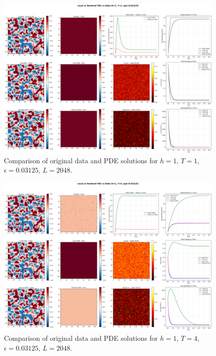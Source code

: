 \documentclass[11pt,a4paper]{article}
\begin{document}
\begin{figure}[!h]
    \centering
    \includegraphics[width=1.0\textwidth]{fig/compare_local_nonlocal_L2048_h1_T1_eps0.03125.png}
    \caption{Comparison of original data and PDE solutions for $h=1$, $T=1$, $\epsilon=0.03125$, $L=2048$.}
    \label{fig:pde_comparison_h1_T1_eps0.03125_L2048}
\end{figure}


\begin{figure}[h]
    \centering
    \includegraphics[width=1.0\textwidth]{fig/compare_local_nonlocal_L2048_h1_T4_eps0.03125.png}
    \caption{Comparison of original data and PDE solutions for $h=1$, $T=4$, $\epsilon=0.03125$, $L=2048$.}
    \label{fig:pde_comparison_h1_T4_eps0.03125_L2048}
\end{figure}
\end{document}
